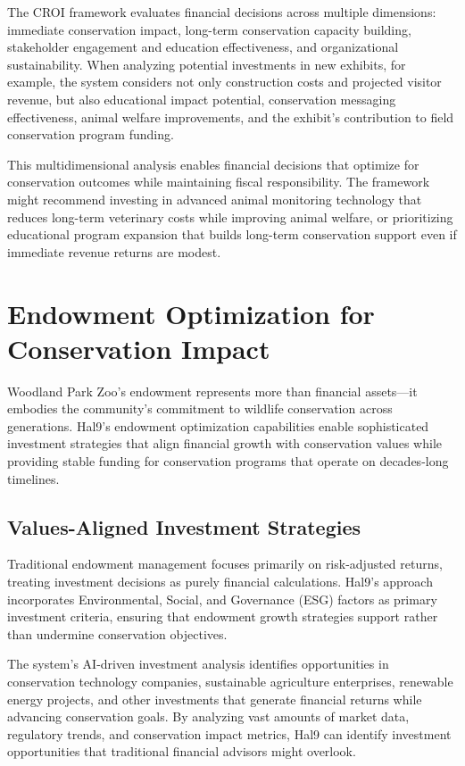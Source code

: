 \documentclass[
  Letterpaper,
]{scrbook}
\begin{document}
The CROI framework evaluates financial decisions across multiple
dimensions: immediate conservation impact, long-term conservation
capacity building, stakeholder engagement and education effectiveness,
and organizational sustainability. When analyzing potential investments
in new exhibits, for example, the system considers not only construction
costs and projected visitor revenue, but also educational impact
potential, conservation messaging effectiveness, animal welfare
improvements, and the exhibit's contribution to field conservation
program funding.

This multidimensional analysis enables financial decisions that optimize
for conservation outcomes while maintaining fiscal responsibility. The
framework might recommend investing in advanced animal monitoring
technology that reduces long-term veterinary costs while improving
animal welfare, or prioritizing educational program expansion that
builds long-term conservation support even if immediate revenue returns
are modest.

\section{Endowment Optimization for Conservation
Impact}\label{endowment-optimization-for-conservation-impact}

Woodland Park Zoo's endowment represents more than financial assets---it
embodies the community's commitment to wildlife conservation across
generations. Hal9's endowment optimization capabilities enable
sophisticated investment strategies that align financial growth with
conservation values while providing stable funding for conservation
programs that operate on decades-long timelines.

\subsection{Values-Aligned Investment
Strategies}\label{values-aligned-investment-strategies}

Traditional endowment management focuses primarily on risk-adjusted
returns, treating investment decisions as purely financial calculations.
Hal9's approach incorporates Environmental, Social, and Governance (ESG)
factors as primary investment criteria, ensuring that endowment growth
strategies support rather than undermine conservation objectives.

The system's AI-driven investment analysis identifies opportunities in
conservation technology companies, sustainable agriculture enterprises,
renewable energy projects, and other investments that generate financial
returns while advancing conservation goals. By analyzing vast amounts of
market data, regulatory trends, and conservation impact metrics, Hal9
can identify investment opportunities that traditional financial
advisors might overlook.
\end{document}
